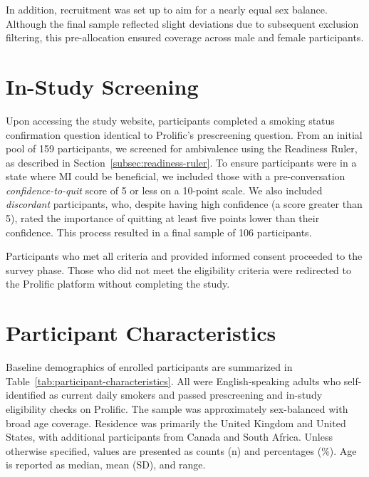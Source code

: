 In addition, recruitment was set up to aim for a nearly equal sex balance. Although the final sample reflected slight deviations due to subsequent exclusion filtering, this pre-allocation ensured coverage across male and female participants.

\section{In-Study Screening}
Upon accessing the study website, participants completed a smoking status confirmation question identical to Prolific's prescreening question. From an initial pool of 159 participants, we screened for ambivalence using the Readiness Ruler, as described in Section~\ref{subsec:readiness-ruler}. To ensure participants were in a state where MI could be beneficial, we included those with a pre-conversation \emph{confidence-to-quit} score of 5 or less on a 10-point scale. We also included \emph{discordant} participants, who, despite having high confidence (a score greater than 5), rated the importance of quitting at least five points lower than their confidence. This process resulted in a final sample of 106 participants.

Participants who met all criteria and provided informed consent proceeded to the survey phase. Those who did not meet the eligibility criteria were redirected to the Prolific platform without completing the study.

\section{Participant Characteristics}
\label{subsec:participant-characteristics}
\noindent Baseline demographics of enrolled participants are summarized in Table~\ref{tab:participant-characteristics}. All were English-speaking adults who self-identified as current daily smokers and passed prescreening and in-study eligibility checks on Prolific. The sample was approximately sex-balanced with broad age coverage. Residence was primarily the United Kingdom and United States, with additional participants from Canada and South Africa. Unless otherwise specified, values are presented as counts (n) and percentages (\%). Age is reported as median, mean (SD), and range.

